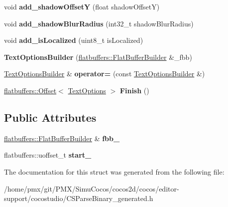\begin{DoxyCompactItemize}
\item 
\mbox{\label{structflatbuffers_1_1TextOptionsBuilder_ad9545031ffbaa4600c01a142daf0545f}} 
void {\bfseries add\+\_\+shadow\+OffsetY} (float shadow\+OffsetY)
\item 
\mbox{\label{structflatbuffers_1_1TextOptionsBuilder_a2a6d3608ee2a29ce5e5a34a5ae13d1cb}} 
void {\bfseries add\+\_\+shadow\+Blur\+Radius} (int32\+\_\+t shadow\+Blur\+Radius)
\item 
\mbox{\label{structflatbuffers_1_1TextOptionsBuilder_abee4999b6dcd4c1a8bb20382affe1144}} 
void {\bfseries add\+\_\+is\+Localized} (uint8\+\_\+t is\+Localized)
\item 
\mbox{\label{structflatbuffers_1_1TextOptionsBuilder_a181982a3467705a50c314ea2dfc1bafd}} 
{\bfseries Text\+Options\+Builder} (\hyperlink{classflatbuffers_1_1FlatBufferBuilder}{flatbuffers\+::\+Flat\+Buffer\+Builder} \&\+\_\+fbb)
\item 
\mbox{\label{structflatbuffers_1_1TextOptionsBuilder_af1ae6cd7016dbb863cfab9f403abd326}} 
\hyperlink{structflatbuffers_1_1TextOptionsBuilder}{Text\+Options\+Builder} \& {\bfseries operator=} (const \hyperlink{structflatbuffers_1_1TextOptionsBuilder}{Text\+Options\+Builder} \&)
\item 
\mbox{\label{structflatbuffers_1_1TextOptionsBuilder_a1cc943f1956626c6ed491182685a726b}} 
\hyperlink{structflatbuffers_1_1Offset}{flatbuffers\+::\+Offset}$<$ \hyperlink{structflatbuffers_1_1TextOptions}{Text\+Options} $>$ {\bfseries Finish} ()
\end{DoxyCompactItemize}
\subsection*{Public Attributes}
\begin{DoxyCompactItemize}
\item 
\mbox{\label{structflatbuffers_1_1TextOptionsBuilder_a0e7d50a88ab3aacc66aa2e852ecb0823}} 
\hyperlink{classflatbuffers_1_1FlatBufferBuilder}{flatbuffers\+::\+Flat\+Buffer\+Builder} \& {\bfseries fbb\+\_\+}
\item 
\mbox{\label{structflatbuffers_1_1TextOptionsBuilder_ad2be999b725b738fd412baec3f244712}} 
flatbuffers\+::uoffset\+\_\+t {\bfseries start\+\_\+}
\end{DoxyCompactItemize}


The documentation for this struct was generated from the following file\+:\begin{DoxyCompactItemize}
\item 
/home/pmx/git/\+P\+M\+X/\+Simu\+Cocos/cocos2d/cocos/editor-\/support/cocostudio/C\+S\+Parse\+Binary\+\_\+generated.\+h\end{DoxyCompactItemize}
